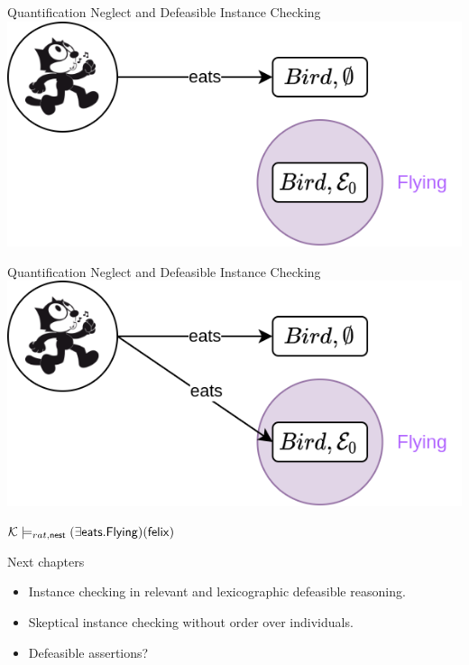 \documentclass[10pt]{beamer}
\begin{document}
\begin{frame}{Quantification Neglect and Defeasible Instance Checking}
  \includegraphics[scale=0.5]{img/propex_felix.png}
\end{frame}

\begin{frame}{Quantification Neglect and Defeasible Instance Checking}
  \includegraphics[scale=0.5]{img/nestex_felix.png}

\vspace{0.5cm}

\begin{center}
  {\Large 
  $ \mathcal{K} \models_{{rat}, \mathsf{ nest}} (\exists \mathsf{eats}.\mathsf{Flying})(\mathsf{felix})$
  }
\end{center}

\end{frame}

\begin{frame}{Next chapters}
  \begin{itemize}
    \item Instance checking in relevant and lexicographic defeasible reasoning.
    \item Skeptical instance checking without order over individuals.
    \item Defeasible assertions?
  \end{itemize}
\end{frame}
\end{document}

